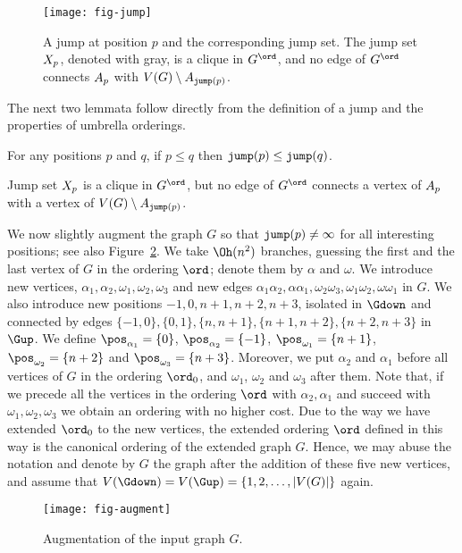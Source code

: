 \begin{figure}
\centering
\texttt{[image: fig-jump]}
\caption{A jump at position $p$ and the corresponding jump set.
  The jump set $X_{p}$, denoted with gray, is a clique in $G^\ord$, and no edge of $G^\ord$
    connects $A_{p}$ with $V(G) \setminus A_{\mathtt{jump}(p)}$.}
\label{fig:jump}
\end{figure}

The next two lemmata follow directly from the definition of a jump and the properties
of  umbrella orderings.
\begin{lemma}\label{lem:jump-ineq}
For any positions $p$ and $q$, if $p \leq q$ then $\mathtt{jump}(p) \leq \mathtt{jump}(q)$.
\end{lemma}
\begin{lemma}\label{lem:jump-cut} Jump set 
$X_{p}$ is  a clique in $G^\ord$, but no edge of $G^\ord$
connects a vertex of $A_{p}$ with a vertex of $V(G) \setminus A_{\mathtt{jump}(p)}$.
\end{lemma}

We now slightly augment the graph $G$ so that $\mathtt{jump}(p) \neq \infty$ for all interesting
positions; see also Figure~\ref{fig:augment}.
We take $\Oh(n^2)$ branches, guessing the first
and the last vertex of $G$ in the ordering $\ord$; denote them by $\alpha$ and $\omega$.
We introduce  new vertices, $\alpha_1,\alpha_2,\omega_1,\omega_2,\omega_3$ 
and new edges $\alpha_1\alpha_2,\alpha\alpha_1,\omega_2\omega_3,\omega_1\omega_2,\omega\omega_1$ in $G$.
We also introduce new positions $-1,0,n+1,n+2,n+3$, isolated in $\Gdown$ and connected
by edges $\{-1,0\},\{0,1\},\{n,n+1\},\{n+1,n+2\},\{n+2,n+3\}$ in $\Gup$.
We define $\pos_{\alpha_1} = \{0\}$, $\pos_{\alpha_2} = \{-1\}$, $\pos_{\omega_1} = \{n+1\}$,
   $\pos_{\omega_2} = \{n+2\}$ and $\pos_{\omega_3} = \{n+3\}$.
Moreover, we put $\alpha_2$ and $\alpha_1$ before all vertices of $G$ in the ordering $\ord_0$,
and $\omega_1$, $\omega_2$ and $\omega_3$ after them.
Note that, if we precede all the vertices in the ordering $\ord$ with
$\alpha_2,\alpha_1$ and succeed with $\omega_1,\omega_2,\omega_3$ we obtain an ordering with no
higher cost. Due to the way we have extended $\ord_0$ to the new vertices, the
extended ordering $\ord$ defined in this way is the canonical ordering
of the extended graph $G$. Hence, we may abuse the notation and denote by $G$
the graph after the addition of these five new vertices, and assume that $V(\Gdown) = V(\Gup) = \{1,2,\ldots,|V(G)|\}$ again.

\begin{figure}
\centering
\texttt{[image: fig-augment]}
\caption{Augmentation of the input graph $G$.}
\label{fig:augment}
\end{figure}


